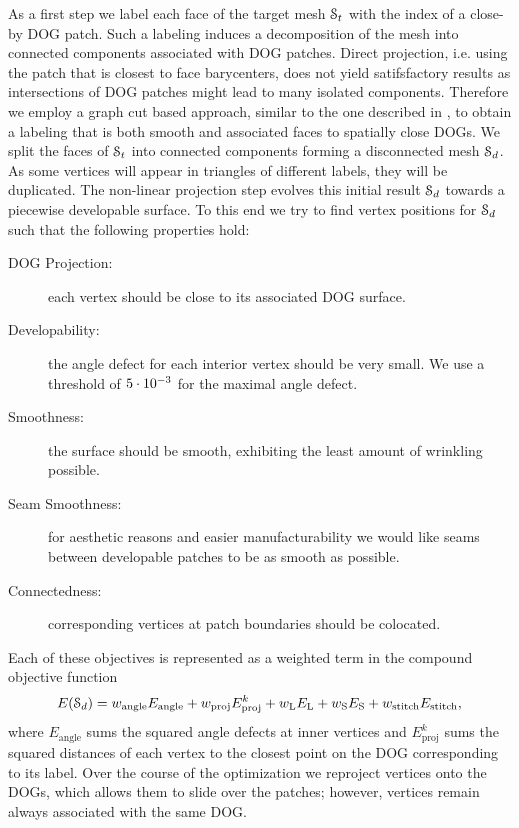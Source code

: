 As a first step we label each face of the target mesh $\mathcal{S}_t$ with the index of a close-by DOG patch. Such a labeling induces a decomposition of the mesh into connected components associated with DOG patches.
Direct projection, i.e. using the patch that is closest to face barycenters, does not yield satifsfactory results as intersections of DOG patches might lead to many isolated components. Therefore we employ a graph cut based approach, similar to the one described in , to obtain a labeling that is both smooth and associated faces to spatially close DOGs. We split the faces of $\mathcal{S}_t$ into connected components forming a disconnected mesh $\mathcal{S}_d$. As some vertices will appear in triangles of different labels, they will be duplicated. 
%
The non-linear projection step evolves this initial result $\mathcal{S}_d$ towards a piecewise developable surface. To this end we try to find vertex positions for $\mathcal{S}_d$ such that the following properties hold:
\begin{description}
	\item[DOG Projection:] each vertex should be close to its associated DOG surface.
	\item[Developability:] the angle defect for each interior vertex should be very small. We use a threshold of $5\cdot 10^{-3}$ for the maximal angle defect.
	\item[Smoothness:] the surface should be smooth, exhibiting the least amount of wrinkling possible.
	\item[Seam Smoothness:] for aesthetic reasons and easier manufacturability we would like seams between developable patches to be as smooth as possible.
	\item[Connectedness:] corresponding vertices at patch boundaries should be colocated.
\end{description}
%
Each of these objectives is represented as a weighted term in the compound objective function 
\begin{equation} \label{eq:proj_step12}
	\nonumber
	E(\mathcal{S}_d) = w_\text{angle}E_\text{angle} + w_\text{proj}E_\text{proj}^k + w_\text{L} E_\text{L} +  w_\text{S} E_\text{S}  + w_\text{stitch}E_\text{stitch},
\end{equation}
%
where $E_\text{angle}$ sums the squared angle defects at inner vertices 
and $E_\text{proj}^k$ sums the squared distances of each vertex to the closest point on the DOG corresponding to its label. Over the course of the optimization 
we reproject vertices onto the DOGs, which allows them to slide over the patches; however, vertices remain always associated with the same DOG.

